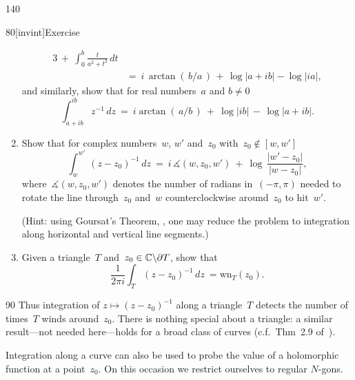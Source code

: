 \begin{parsec}{140}
\begin{point}{80}[invint]{Exercise}
\begin{enumerate}
\begin{alignat*}{3}
	\ +\ 
	\int_0^b \frac{t}{a^2+t^2}\,dt\\
	\ &=\ 
	\textstyle
	i\,\arctan(\,b/a\,)
	\,+\, \log\left|a+ib\right| - \log\left|ia\right|,
\end{alignat*}
and similarly, show that for real numbers~$a$ and $b\neq 0$
\begin{equation*}
	\int_{a+ib}^{ib} z^{-1}\,dz
	\ = \ 
	i\arctan(\,a/b\,) \ +\ 
	\log\left|ib\right| \,-\,
	\log\left|a+ib\right|.
\end{equation*}
	\item
Show that for complex numbers~$w$, $w'$ and~$z_0$
with~$z_0\notin [w,w']$
\begin{equation*}
	\int_{w}^{w'}\,(z-z_0)^{-1}\,dz
\ = \ 
i\, \measuredangle(w,z_0,w')\ +\ 
\log\,\frac{\left|w'-z_0\right|}{\left|w-z_0\right|},
\end{equation*}
where~$\measuredangle(w,z_0,w')$
denotes
the number of radians
in~$(-\pi,\pi)$
needed
to rotate the line through~$z_0$ and~$w$
counterclockwise around~$z_0$ to hit~$w'$.

(Hint: 
using Goursat's Theorem, ,
one may reduce the problem
to integration along horizontal and vertical line segments.)
\item
Given a triangle~$T$ and~$z_0\in\mathbb{C}\backslash \partial T$,
show that
\begin{equation*}
	\frac{1}{2\pi i}\int_T (z-z_0)^{-1}\,dz
	\ =  \mathrm{wn}_T(z_0).
\end{equation*}%
\end{enumerate}%
\spacingfix{}%
\end{point}%
\begin{point}{90}%
Thus integration of 
$z\mapsto (z-z_0)^{-1}$
along a triangle~$T$ detects
the number of times~$T$ winds
around~$z_0$.
There is nothing special about a triangle:
a similar result---not needed here---holds
for a broad class of curves
(c.f.~Thm~2.9 of~\cite{conway2013}).

Integration along a curve can also be used
to probe the value of a holomorphic function at a point~$z_0$.
On this occasion
we restrict ourselves
to regular $N$-gons.
\end{point}
\end{parsec}%
